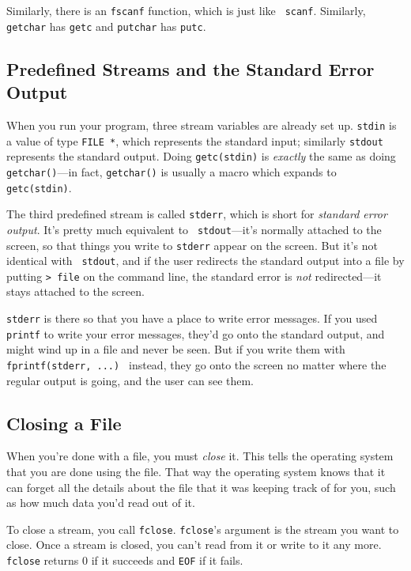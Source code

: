 Similarly, there is an {\tt fscanf} function, which is just like {\tt
scanf}.  Similarly, {\tt getchar} has {\tt getc} and {\tt putchar} has
{\tt putc}.  

\subsection{Predefined Streams and the Standard Error Output}

When you run your program, three stream variables are already set up.
{\tt stdin} is a value of type {\tt FILE *}, which represents the
standard input; similarly {\tt stdout} represents the standard output.
Doing {\tt getc(stdin)} is {\em exactly}\/ the same as doing {\tt
getchar()}---in fact, {\tt getchar()} is usually a macro which expands
to {\tt getc(stdin)}.

The third predefined stream is called {\tt stderr}, which is short for
{\em standard error output}\/.  It's pretty much equivalent to {\tt
stdout}---it's normally attached to the screen, so that things you write
to {\tt stderr} appear on the screen.  But it's not identical with {\tt
stdout}, and if the user redirects the standard output into a file by
putting {\tt > file} on the command line, the standard error is {\em
not}\/ redirected---it stays attached to the screen.

{\tt stderr} is there so that you have a place to write error messages.
If you used {\tt printf} to write your error messages, they'd go onto
the standard output, and might wind up in a file and never be seen.  But
if you write them with {\tt fprintf(stderr, ...) }  instead, they go
onto the screen no matter where the regular output is going, and the
user can see them.

\subsection{Closing a File}

When you're done with a file, you must {\em close}\/ it.  This tells the
operating system that you are done using the file.  That way the
operating system knows that it can forget all the details about the file
that it was keeping track of for you, such as how much data you'd read
out of it.  

To close a stream, you call {\tt fclose}.  {\tt fclose}'s argument is
the stream you want to close.  Once a stream is closed, you can't read
from it or write to it any more.  {\tt fclose} returns 0 if it succeeds
and {\tt EOF} if it fails.

